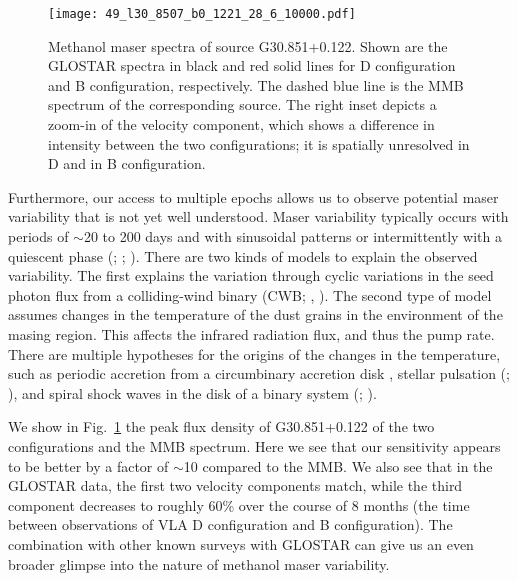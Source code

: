 \documentclass{aa}
\begin{document}
\begin{figure}
        \texttt{[image: 49\_l30\_8507\_b0\_1221\_28\_6\_10000.pdf]}
        \caption{Methanol maser spectra of source G30.851+0.122. Shown   are the GLOSTAR spectra in black and red solid lines for D configuration and B configuration, respectively. The dashed blue line is the MMB spectrum of the corresponding source. The right inset depicts a zoom-in of the  velocity component, which shows a difference in intensity between the two configurations; it is spatially unresolved in  D and in B configuration.}
        \label{fig:var_meth}
\end{figure}

Furthermore, our access to multiple epochs allows us to observe potential maser variability that is not yet well understood. Maser variability typically occurs with periods of $\sim$20 to 200 days and with sinusoidal patterns or intermittently with a quiescent phase (\citealt{goedhart2004}; \citealt{szymczak2018}; \citealt{olech2019}).
There are two kinds of models to explain the observed variability. The first explains the variation through cyclic variations in the seed photon flux from a colliding-wind binary (CWB; \citealt{vanderwalt2009}, \citealt{vanderwalt2011}). The second type of model assumes changes in the temperature of the dust grains in the environment of the masing region. This affects the infrared radiation flux, and thus the pump rate. There are multiple hypotheses for the origins of the changes in the temperature, such as periodic accretion from a circumbinary accretion disk \citep{araya2010},
stellar pulsation (\citealt{inayoshi2013}; \citealt{sanna2015}), and spiral shock waves in the disk of a binary system (\citealt{ps2014}; \citealt{szymczak2018}).

We show in Fig.~\ref{fig:var_meth} the
peak flux density of G30.851+0.122  of the two configurations and  the MMB
spectrum. Here we see that our sensitivity appears to be better by a factor of $\sim$10 compared to the MMB. We also see that in the GLOSTAR data, the first two velocity components match, while
the third component decreases to roughly 60\% over the course of 8 months (the time between
observations of VLA D configuration and B configuration). The combination with other known surveys with GLOSTAR can give us an even broader glimpse into the nature of methanol maser variability.
\end{document}
